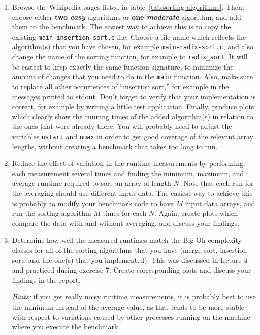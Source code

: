 \documentclass[a4paper,10pt]{article}
\begin{document}
\begin{enumerate}

\item
  Browse the Wikipedia pages listed in table~\ref{tab:sorting-algorithms}.
  Then, choose either \textbf{two \emph{easy}} algorithms or \textbf{one \emph{moderate}} algorithm, and add them to the benchmark.
  The easiest way to achieve this is to copy the existing \texttt{main-insertion-sort.c} file.
  Choose a file name which reflects the algorithm(s) that you have chosen, for example \texttt{main-radix-sort.c}, and also change the name of the sorting function, for example to \texttt{radix\_sort}.
  It will be easiest to keep exactly the same function signature, to minimize the amount of changes that you need to do in the \texttt{main} function.
  Also, make sure to replace all other occurrences of ``insertion sort,'' for example in the messages printed to stdout.
  Don't forget to verify that your implementation is correct, for example by writing a little test application.
  Finally, produce plots which clearly show the running times of the added algorithm(s) in relation to the ones that were already there.
  You will probably need to adjust the variables \texttt{nstart} and \texttt{nmax} in order to get good coverage of the relevant array lengths, without creating a benchmark that takes too long to run.
  
\item
  Reduce the effect of variation in the runtime measurements by performing each measurement several times and finding the minimum, maximum, and average runtime required to sort an array of length $N$.
  Note that each run for the averaging should use different input data.
  The easiest way to achieve this is probably to modify your benchmark code to have $M$ input data arrays, and run the sorting algorithm $M$ times for each $N$.
  Again, create plots which compare the data with and without averaging, and discuss your findings.
  
\item
  Determine how well the measured runtimes match the Big-Oh complexity classes for all of the sorting algorithms that you have (merge sort, insertion sort, and the one(s) that you implemented).
  This was discussed in lecture 4 and practiced during exercise 7.
  Create corresponding plots and discuss your findings in the report.
  
  \emph{Hints:} if you get really noisy runtime measurements, it is probably best to use the minimum instead of the average value, as that tends to be more stable with respect to variations caused by other processes running on the machine where you execute the benchmark.

\end{enumerate}
\end{document}
